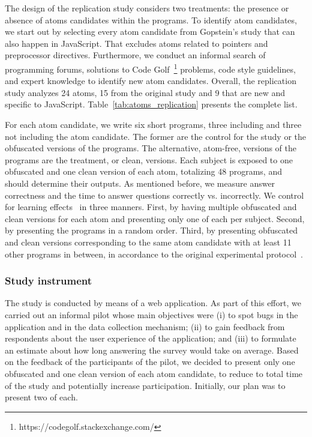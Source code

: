 The design of the replication study considers two treatments: the presence or absence of atoms candidates within the programs. To identify atom candidates, we start out by selecting every atom candidate from Gopstein's study that can also happen in JavaScript. That excludes atoms related to pointers and preprocessor directives. Furthermore, we conduct an informal search of programming forums, solutions to Code Golf~\footnote{https://codegolf.stackexchange.com/} problems, code style guidelines, and expert knowledge to identify new atom candidates. Overall, the replication study analyzes 24 atoms, 15 from the original study and 9 that are new and specific to JavaScript. Table~\ref{tab:atoms_replication} presents the complete list. 

For each atom candidate, we write six short programs, three including and three not including the atom candidate. The former are the control for the study or the obfuscated versions of the programs. The alternative, atom-free, versions of the programs are the treatment, or clean, versions. Each subject is exposed to one obfuscated and one clean version of each atom, totalizing 48 programs, and should determine their outputs. As mentioned before, we measure answer correctness and the time to answer questions correctly vs. incorrectly. We control for learning effects~\cite{Neely:1991:SPE} in three manners. First, by having multiple obfuscated and clean versions for each atom and presenting only one of each per subject. Second, by presenting the programs in a random order. Third, by presenting obfuscated and clean versions corresponding to the same atom candidate with at least 11 other programs in between, in  accordance to the original experimental protocol~\cite{DBLP:conf/sigsoft/GopsteinIYDZYC17}. 

\subsubsection*{Study instrument} 

The study is conducted by means of a web application. As part of this effort, we carried out an informal pilot whose main objectives were (i) to spot bugs in the application and in the data collection mechanism; (ii) to gain feedback from respondents about the user experience of the application; and (iii) to formulate an estimate about how long answering the survey would take on average. Based on the feedback of the participants of the pilot, we decided to present only one obfuscated and one clean version of each atom candidate, to reduce to total time of the study and potentially increase participation. Initially, our plan was to present two of each. 

